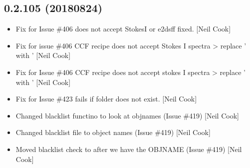 \documentclass[a4paper,10pt,english]{report}
\begin{document}
\subsection{0.2.105 (2018\sphinxhyphen{}08\sphinxhyphen{}24)}
\label{\detokenize{misc/changelog:id373}}\begin{itemize}
\item {} 
Fix for Issue \#406 \sphinxhyphen{}  does not accept StokesI or e2dsff \sphinxhyphen{}
fixed. {[}Neil Cook{]}

\item {} 
Fix for issue \#406 \sphinxhyphen{} CCF recipe does not accept Stokes I spectra \textendash{}\textgreater{}
replace ’ with ’ {[}Neil Cook{]}

\item {} 
Fix for Issue \#406 \sphinxhyphen{}CCF recipe does not accept stokes I spectra \textendash{}\textgreater{}
replace ’ with ’ {[}Neil Cook{]}

\item {} 
Fix for Issue \#423 \sphinxhyphen{}  fails if folder does not exist. {[}Neil
Cook{]}

\item {} 
Changed blacklist functino to look at objnames (Issue \#419) {[}Neil
Cook{]}

\item {} 
Changed blacklist file to object names (Issue \#419) {[}Neil Cook{]}

\item {} 
Moved blacklist check to after we have the OBJNAME (Issue \#419) {[}Neil
Cook{]}

\end{itemize}
\end{document}
